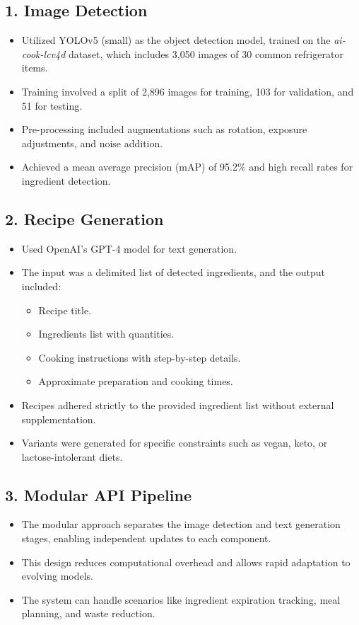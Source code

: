 \documentclass[letterpaper,11pt]{report}
\begin{document}
\subsection{1. Image Detection}
\begin{itemize}
    \item Utilized YOLOv5 (small) as the object detection model, trained on the \textit{ai-cook-lcv4d} dataset, which includes 3,050 images of 30 common refrigerator items.
    \item Training involved a split of 2,896 images for training, 103 for validation, and 51 for testing.
    \item Pre-processing included augmentations such as rotation, exposure adjustments, and noise addition.
    \item Achieved a mean average precision (mAP) of 95.2\% and high recall rates for ingredient detection.
\end{itemize}

\subsection{2. Recipe Generation}
\begin{itemize}
    \item Used OpenAI's GPT-4 model for text generation.
    \item The input was a delimited list of detected ingredients, and the output included:
          \begin{itemize}
              \item Recipe title.
              \item Ingredients list with quantities.
              \item Cooking instructions with step-by-step details.
              \item Approximate preparation and cooking times.
          \end{itemize}
    \item Recipes adhered strictly to the provided ingredient list without external supplementation.
    \item Variants were generated for specific constraints such as vegan, keto, or lactose-intolerant diets.
\end{itemize}

\subsection{3. Modular API Pipeline}
\begin{itemize}
    \item The modular approach separates the image detection and text generation stages, enabling independent updates to each component.
    \item This design reduces computational overhead and allows rapid adaptation to evolving models.
    \item The system can handle scenarios like ingredient expiration tracking, meal planning, and waste reduction.
\end{itemize}
\end{document}
